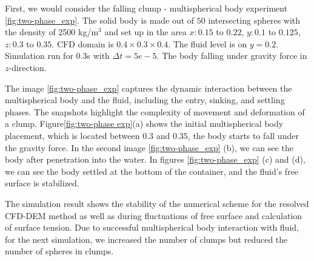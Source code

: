 First, we would consider the falling clump - multispherical body experiment \ref{fig:two-phase_exp}. The solid body is made out of $50$ intersecting spheres with the density of 2500 kg/m$^3$ and set up in the area $x: 0.15 $ to $0.22$, $y: 0.1$ to $0.125$, $z: 0.3$ to $0.35$. CFD domain is $0.4\times 0.3\times0.4$. The fluid level is on $y = 0.2$. Simulation run for $0.3$s with $\Delta t = 5e-5$. The body falling under gravity force in $z$-direction. 

The image \ref{fig:two-phase_exp} captures the dynamic interaction between the multispherical body and the fluid, including the entry, sinking, and settling phases. The snapshots highlight the complexity of movement and deformation of a clump. Figure\ref{fig:two-phase exp}(a) shows the initial multispherical body placement, which is located between $0.3$ and $0.35$, the body starts to fall under the gravity force. In the second image \ref{fig:two-phase_exp} (b), we can see the body after penetration into the water. In figures \ref{fig:two-phase_exp} (c) and (d), we can see the body settled at the bottom of the container, and the fluid's free surface is stabilized.

The simulation result shows the stability of the numerical scheme for the resolved CFD-DEM method as well as during fluctuations of free surface and calculation of surface tension. Due to successful multispherical body interaction with fluid, for the next simulation, we increased the number of clumps but reduced the number of spheres in clumps. 

